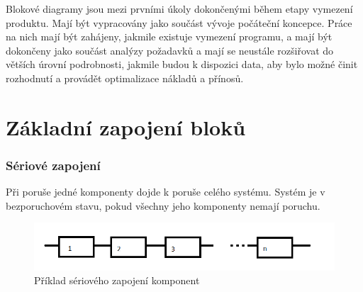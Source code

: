 \documentclass[FM,RP]{tulthesis}
\begin{document}
        Blokové diagramy jsou mezi prvními úkoly dokončenými během etapy vymezení produktu. 
        Mají být vypracovány jako součást vývoje počáteční koncepce. 
        Práce na nich mají být zahájeny, jakmile existuje vymezení programu, a mají být dokončeny jako součást analýzy požadavků a 
        mají se neustále rozšiřovat do větších úrovní podrobnosti, 
        jakmile budou k dispozici data, aby bylo možné činit rozhodnutí a provádět optimalizace nákladů a přínosů.\cite{2}

    \section{Základní zapojení bloků}
        \subsubsection*{Sériové zapojení}
            Při poruše jedné komponenty dojde k poruše celého systému. 
            Systém je v bezporuchovém stavu, pokud všechny jeho komponenty nemají poruchu.\cite{5}
            \begin{figure}[h]
                \centering
                \includegraphics[scale=0.75]{pic/seriove.png}
                \caption{Příklad sériového zapojení komponent} \label{Obrázek č. 2.1}
            \end{figure}
\end{document}
